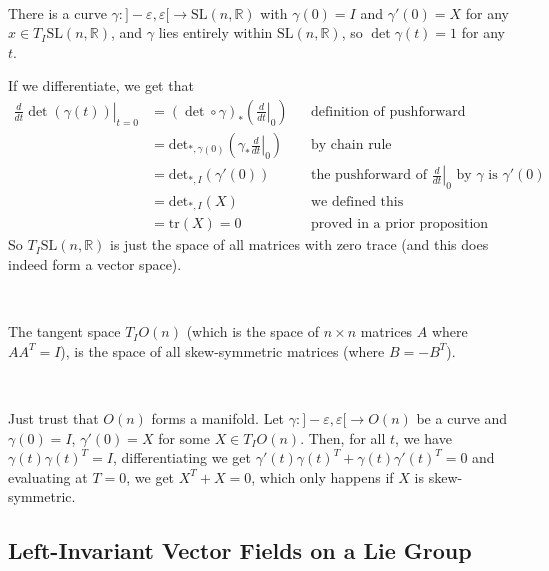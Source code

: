 \documentclass{article}
\begin{document}
\begin{customproof}
  \

There is a curve $\gamma: ]-\varepsilon, \varepsilon[ \to \text{SL}(n, \mathbb{R})$ with $\gamma(0) = I$ and $\gamma'(0) = X$ for any $x \in T_I\text{SL}(n,\mathbb{R})$, and $\gamma$ lies entirely within $\text{SL}(n, \mathbb{R})$, so $\det \gamma(t) = 1$ for any $t$.

  If we differentiate, we get that
  \begin{align*}
    \left.\frac{d}{dt} \det(\gamma(t)) \right\vert_{t=0} &= (\det \circ \gamma)_*(\left.\frac{d}{dt}\right\vert_0) && \text{definition of pushforward acting on a tangent vector}\\
    &= \text{det}_{*,\gamma(0)} (\gamma_* \left.\frac{d}{dt}\right\vert_0) && \text{by chain rule}\\
    &= \text{det}_{*, I}(\gamma'(0)) && \text{the pushforward of $\left.\frac{d}{dt}\right\vert_0$ by $\gamma$ is $\gamma'(0)$}\\
    &= \text{det}_{*,I}(X)&&\text{we defined this}\\
    &= \text{tr}(X) = 0 && \text{proved in a prior proposition}
  \end{align*}So $T_I\text{SL}(n, \mathbb{R})$ is just the space of all matrices with zero trace (and this does indeed form a vector space).
\end{customproof}

\begin{proposition}
  \

  The tangent space $T_IO(n)$ (which is the space of $n \times n$ matrices $A$ where $AA^T = I$), is the space of all skew-symmetric matrices (where $B = -B^T$).
\end{proposition}

\begin{customproof}
  \

Just trust that $O(n)$ forms a manifold. Let $\gamma: ]-\varepsilon, \varepsilon[ \to O(n)$ be a curve and $\gamma(0) = I$, $\gamma'(0) = X$ for some $X \in T_I O(n)$. Then, for all $t$, we have $\gamma(t)\gamma(t)^T = I$, differentiating we get $\gamma'(t)\gamma(t)^T + \gamma(t)\gamma'(t)^T = 0$ and evaluating at $T=0$, we get $X^T + X = 0$, which only happens if $X$ is skew-symmetric.
\end{customproof}

\subsection{Left-Invariant Vector Fields on a Lie Group}
\
\end{document}
